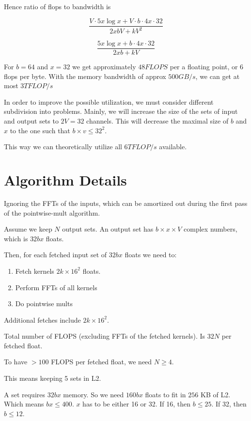   Hence ratio of flops to bandwidth is

  $$ \frac{ V \cdot 5x \log x + V \cdot b \cdot 4x \cdot 32 }{2xbV + kV^2}$$


  $$ \frac{ 5x \log x + b \cdot 4x \cdot 32 }{2xb + kV}$$

  For $b = 64$ and $x = 32$ we get approximately $48 FLOPS$ per a
  floating point, or $6$ flops per byte.  With the memory bandwidth of
  approx $500 GB/s$, we can get at most $3 TFLOP/s$


  In order to improve the possible utilization, we must consider
  different subdivision into problems.  Mainly, we will increase the
  size of the sets of input and output sets to $2V = 32$ channels.
  This will decrease the maximal size of $b$ and $x$ to the one such
  that $b\times v \le 32^2$.

  This way we can theoretically utilize all $6 TFLOP/s$ available.


\section{Algorithm Details}

  Ignoring the FFTs of the inputs, which can be amortized out during
  the first pass of the pointwise-mult algorithm.

  Assume we keep $N$ output sets.  An output set has $b \times x
  \times V$ complex numbers, which is $32bx$ floats.

  Then, for each fetched input set of $32bx$ floats we need to:

  \begin{enumerate}
    \item Fetch kernels $2k \times 16^2$ floats.
    \item Perform FFTs of all kernels
    \item Do pointwise mults
  \end{enumerate}

  Additional fetches include $2k \times 16^2$.

  Total number of FLOPS (excluding FFTs of the fetched kernels).  Is
  $32N$ per fetched float.

  To have $> 100$ FLOPS per fetched float, we need $N \ge 4$.

  This means keeping 5 sets in L2.

  A set requires $32bx$ memory.  So we need $160bx$ floats to fit in
  $256$ KB of L2.  Which means $bx \le 400$.  $x$ has to be either 16
  or 32.  If 16, then $b \le 25$.  If 32, then $b \le 12$.

